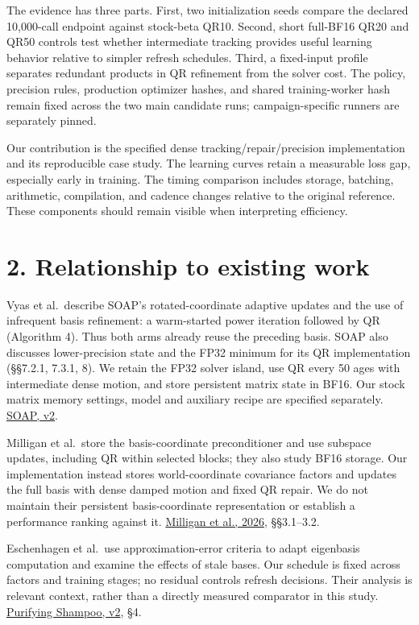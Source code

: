 \documentclass[
  10pt,
]{article}
\begin{document}
The evidence has three parts. First, two initialization seeds compare
the declared 10,000-call endpoint against stock-beta QR10. Second, short
full-BF16 QR20 and QR50 controls test whether intermediate tracking
provides useful learning behavior relative to simpler refresh schedules.
Third, a fixed-input profile separates redundant products in QR
refinement from the solver cost. The policy, precision rules, production
optimizer hashes, and shared training-worker hash remain fixed across
the two main candidate runs; campaign-specific runners are separately
pinned.

Our contribution is the specified dense tracking/repair/precision
implementation and its reproducible case study. The learning curves
retain a measurable loss gap, especially early in training. The timing
comparison includes storage, batching, arithmetic, compilation, and
cadence changes relative to the original reference. These components
should remain visible when interpreting efficiency.

\hypertarget{relationship-to-existing-work}{%
\section{2. Relationship to existing
work}\label{relationship-to-existing-work}}

Vyas et al.~describe SOAP's rotated-coordinate adaptive updates and the
use of infrequent basis refinement: a warm-started power iteration
followed by QR (Algorithm 4). Thus both arms already reuse the preceding
basis. SOAP also discusses lower-precision state and the FP32 minimum
for its QR implementation (§§7.2.1, 7.3.1, 8). We retain the FP32 solver
island, use QR every 50 ages with intermediate dense motion, and store
persistent matrix state in BF16. Our stock matrix memory settings, model
and auxiliary recipe are specified separately.
\href{https://arxiv.org/abs/2409.11321v2}{SOAP, v2}.

Milligan et al.~store the basis-coordinate preconditioner and use
subspace updates, including QR within selected blocks; they also study
BF16 storage. Our implementation instead stores world-coordinate
covariance factors and updates the full basis with dense damped motion
and fixed QR repair. We do not maintain their persistent
basis-coordinate representation or establish a performance ranking
against it. \href{https://arxiv.org/html/2605.26327v1}{Milligan et al.,
2026}, §§3.1--3.2.

Eschenhagen et al.~use approximation-error criteria to adapt eigenbasis
computation and examine the effects of stale bases. Our schedule is
fixed across factors and training stages; no residual controls refresh
decisions. Their analysis is relevant context, rather than a directly
measured comparator in this study.
\href{https://arxiv.org/html/2506.03595v2}{Purifying Shampoo, v2}, §4.
\end{document}
